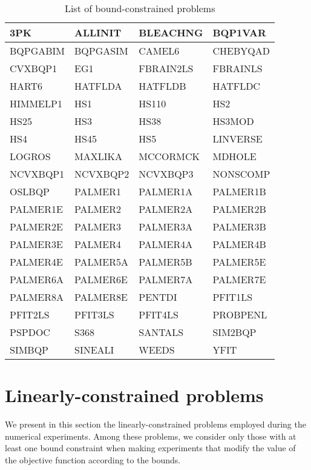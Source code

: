 \begin{longtable}{llll}
    \caption{List of bound-constrained problems}\\
    \toprule
    3PK         & ALLINIT   & BLEACHNG  & BQP1VAR\\
    \midrule
    BQPGABIM    & BQPGASIM  & CAMEL6    & CHEBYQAD\\
    \midrule
    CVXBQP1     & EG1       & FBRAIN2LS & FBRAINLS\\
    \midrule
    HART6       & HATFLDA   & HATFLDB   & HATFLDC\\
    \midrule
    HIMMELP1    & HS1       & HS110     & HS2\\
    \midrule
    HS25        & HS3       & HS38      & HS3MOD\\
    \midrule
    HS4         & HS45      & HS5       & LINVERSE\\
    \midrule
    LOGROS      & MAXLIKA   & MCCORMCK  & MDHOLE\\
    \midrule
    NCVXBQP1    & NCVXBQP2  & NCVXBQP3  & NONSCOMP\\
    \midrule
    OSLBQP      & PALMER1   & PALMER1A  & PALMER1B\\
    \midrule
    PALMER1E    & PALMER2   & PALMER2A  & PALMER2B\\
    \midrule
    PALMER2E    & PALMER3   & PALMER3A  & PALMER3B\\
    \midrule
    PALMER3E    & PALMER4   & PALMER4A  & PALMER4B\\
    \midrule
    PALMER4E    & PALMER5A  & PALMER5B  & PALMER5E\\
    \midrule
    PALMER6A    & PALMER6E  & PALMER7A  & PALMER7E\\
    \midrule
    PALMER8A    & PALMER8E  & PENTDI    & PFIT1LS\\
    \midrule
    PFIT2LS     & PFIT3LS   & PFIT4LS   & PROBPENL\\
    \midrule
    PSPDOC      & S368      & SANTALS   & SIM2BQP\\
    \midrule
    SIMBQP      & SINEALI   & WEEDS     & YFIT\\
    \bottomrule
    \end{longtable}

\section{Linearly-constrained problems}

We present in this section the linearly-constrained problems employed during the numerical experiments.
Among these problems, we consider only those with at least one bound constraint when making experiments that modify the value of the objective function according to the bounds.


